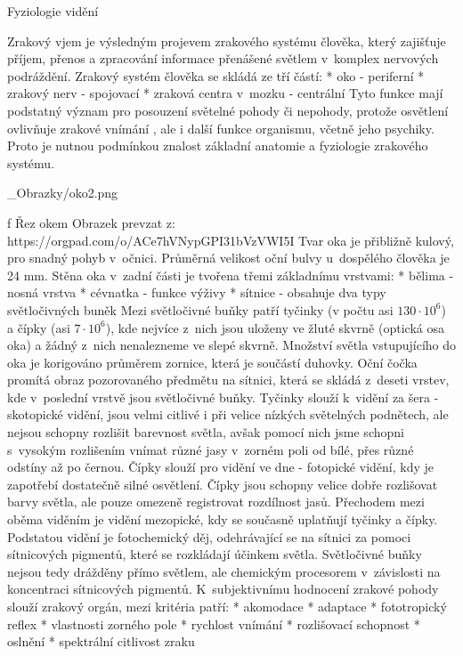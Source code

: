 \chap Fyziologie vidění

Zrakový vjem je výsledným projevem zrakového systému člověka, který zajišťuje příjem, přenos a zpracování
informace přenášené světlem v~komplex nervových podráždění. Zrakový systém člověka se skládá ze tří částí:
\medskip
\begitems
    * oko - periferní
    * zrakový nerv - spojovací
    * zraková centra v~mozku - centrální
\enditems
\medskip
Tyto funkce mají podstatný význam pro posouzení světelné pohody či nepohody, protože osvětlení  ovlivňuje
zrakové vnímání , ale i další funkce organismu, včetně jeho psychiky. Proto je nutnou podmínkou znalost základní
anatomie a fyziologie zrakového systému.

\medskip {}
\picw=10cm _Obrazky/oko2.png
\caption/f Řez okem
\medskip
Obrazek prevzat z: https://orgpad.com/o/ACe7hVNypGPI31bVzVWI5I
\medskip
Tvar oka je přibližně kulový, pro snadný pohyb v~očnici. Průměrná velikost oční bulvy u~dospělého člověka je 24 mm.
Stěna oka v~zadní části  je tvořena třemi základnímu vrstvami:
\medskip
\begitems
    * bělima - nosná vrstva
    * cévnatka - funkce výživy
    * sítnice - obsahuje dva typy světločivných buněk
\enditems
\medskip
Mezi světločivné buňky patří tyčinky (v počtu asi $130\cdot10^6$) a čípky (asi $7\cdot10^6$), kde
nejvíce z~nich jsou uloženy ve žluté skvrně (optická osa oka) a žádný z~nich nenalezneme ve slepé skvrně.
\medskip
Množství světla vstupujícího do oka je korigováno průměrem zornice, která je součástí duhovky.
Oční čočka promítá obraz pozorovaného předmětu na sítnici, která se skládá z~deseti vrstev,
kde v~poslední vrstvě jsou světločivné buňky. Tyčinky slouží k~vidění za šera - {\sbf skotopické vidění},
jsou velmi citlivé i při velice nízkých světelných podnětech, ale nejsou schopny rozlišit barevnost
světla, avšak pomocí nich jsme schopni s~vysokým rozlišením vnímat různé jasy v~zorném poli od bílé,
přes různé odstíny až po černou. Čípky slouží pro vidění ve dne - {\sbf fotopické vidění},
kdy je zapotřebí dostatečně silné osvětlení. Čípky jsou schopny velice dobře rozlišovat barvy světla,
ale pouze omezeně registrovat rozdílnost jasů. Přechodem mezi oběma viděním je vidění {\sbf mezopické},
kdy se současně uplatňují tyčinky a čípky.
\medskip
Podstatou vidění je fotochemický děj, odehrávající se na sítnici za pomoci sítnicových pigmentů, které se
rozkládají účinkem světla. Světločivné buňky nejsou tedy drážděny přímo světlem, ale chemickým procesorem
v~závislosti na koncentraci sítnicových pigmentů.
\medskip
K~subjektivnímu hodnocení zrakové pohody slouží zrakový orgán, mezi kritéria patří:
\medskip
\begitems
    * akomodace
    * adaptace
    * fototropický reflex
    * vlastnosti zorného pole
    * rychlost vnímání
    * rozlišovací schopnost
    * oslnění
    * spektrální citlivost zraku
\enditems
\medskip

